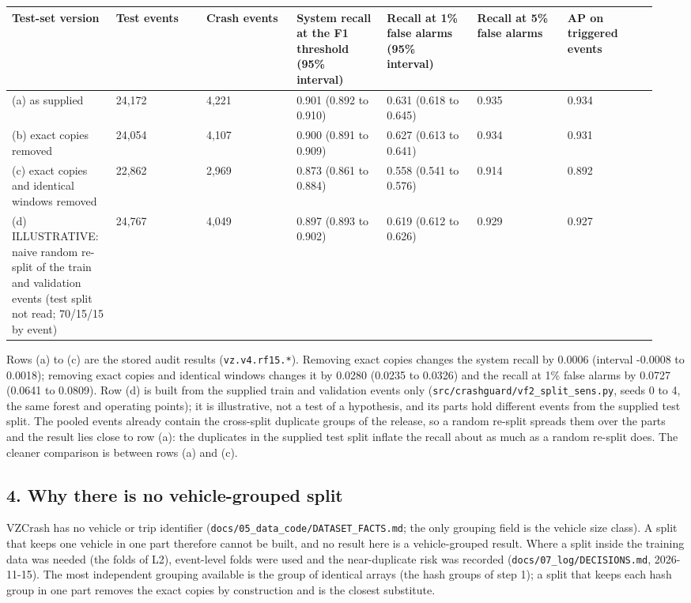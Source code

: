 {\scriptsize\raggedright
\begin{longtable}{p{0.136\linewidth}p{0.136\linewidth}p{0.136\linewidth}p{0.136\linewidth}p{0.136\linewidth}p{0.136\linewidth}p{0.136\linewidth}}
\toprule
Test-set version & Test events & Crash events & System recall at the F1 threshold (95\% interval) & Recall at 1\% false alarms (95\% interval) & Recall at 5\% false alarms & AP on triggered events \\
\midrule
\endhead
(a) as supplied & 24,172 & 4,221 & 0.901 (0.892 to 0.910) & 0.631 (0.618 to 0.645) & 0.935 & 0.934 \\
(b) exact copies removed & 24,054 & 4,107 & 0.900 (0.891 to 0.909) & 0.627 (0.613 to 0.641) & 0.934 & 0.931 \\
(c) exact copies and identical windows removed & 22,862 & 2,969 & 0.873 (0.861 to 0.884) & 0.558 (0.541 to 0.576) & 0.914 & 0.892 \\
(d) ILLUSTRATIVE: naive random re-split of the train and validation events (test split not read; 70/15/15 by event) & 24,767 & 4,049 & 0.897 (0.893 to 0.902) & 0.619 (0.612 to 0.626) & 0.929 & 0.927 \\
\bottomrule
\end{longtable}}

Rows (a) to (c) are the stored audit results (\texttt{vz.v4.rf15.*}). Removing exact copies changes the system recall by 0.0006 (interval -0.0008 to 0.0018); removing exact copies and identical windows changes it by 0.0280 (0.0235 to 0.0326) and the recall at 1\% false alarms by 0.0727 (0.0641 to 0.0809). Row (d) is built from the supplied train and validation events only (\texttt{src/crashguard/vf2\_split\_sens.py}, seeds 0 to 4, the same forest and operating points); it is illustrative, not a test of a hypothesis, and its parts hold different events from the supplied test split. The pooled events already contain the cross-split duplicate groups of the release, so a random re-split spreads them over the parts and the result lies close to row (a): the duplicates in the supplied test split inflate the recall about as much as a random re-split does. The cleaner comparison is between rows (a) and (c).

\subsection*{4. Why there is no vehicle-grouped split}

VZCrash has no vehicle or trip identifier (\texttt{docs/05\_data\_code/DATASET\_FACTS.md}; the only grouping field is the vehicle size class). A split that keeps one vehicle in one part therefore cannot be built, and no result here is a vehicle-grouped result. Where a split inside the training data was needed (the folds of L2), event-level folds were used and the near-duplicate risk was recorded (\texttt{docs/07\_log/DECISIONS.md}, 2026-11-15). The most independent grouping available is the group of identical arrays (the hash groups of step 1); a split that keeps each hash group in one part removes the exact copies by construction and is the closest substitute.

